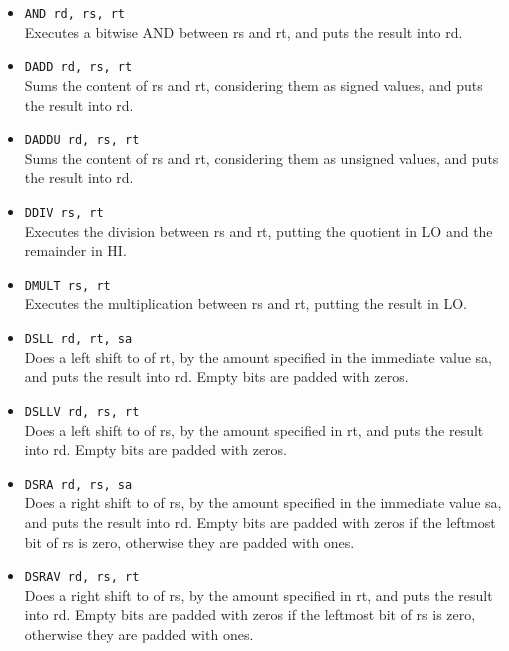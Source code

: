 \documentclass[12pt]{report}
\begin{document}
\begin{itemize}
	\item \texttt{AND rd, rs, rt}\\
	Executes a bitwise AND between rs and rt, and puts the result into rd.

	\item \texttt{DADD rd, rs, rt}\\
	Sums the content of rs and rt, considering them as signed values, and puts
	the result into rd.

	\item \texttt{DADDU rd, rs, rt}\\
	Sums the content of rs and rt, considering them as unsigned values, and puts
	the result into rd.

	\item \texttt{DDIV rs, rt}\\
	Executes the division between rs and rt, putting the quotient in LO and the
	remainder in HI.

	\item \texttt{DMULT rs, rt}\\
	Executes the multiplication between rs and rt, putting the result in LO.

	\item \texttt{DSLL rd, rt, sa}\\
	Does a left shift to of rt, by the amount specified in the
	immediate value sa, and puts the result into rd. Empty bits are padded with
	zeros.

	\item \texttt{DSLLV rd, rs, rt}\\
	Does a left shift to of rs, by the amount specified in rt, and puts the
	result into rd. Empty bits are padded with zeros.

	\item \texttt{DSRA rd, rs, sa}\\
	Does a right shift to of rs, by the amount specified in the immediate value
	sa, and puts the result into rd. Empty bits are padded with zeros if the
	leftmost bit of rs is zero, otherwise they are padded with ones.

	\item \texttt{DSRAV rd, rs, rt}\\
	Does a right shift to of rs, by the amount specified in rt, and puts the
	result into rd. Empty bits are padded with zeros if the leftmost bit of rs
	is zero, otherwise they are padded with ones.


\end{itemize}
\end{document}
